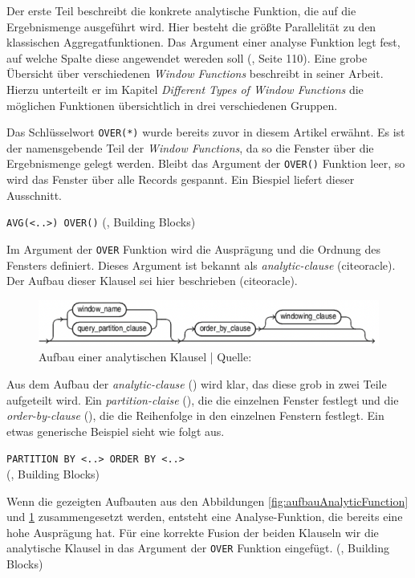 Der erste Teil beschreibt die konkrete analytische Funktion, die auf die
Ergebnismenge ausgeführt wird. Hier besteht die größte Parallelität zu den klassischen
Aggregatfunktionen. Das Argument einer analyse Funktion legt fest, auf welche Spalte
diese angewendet wereden soll (\cite{schicker2017datenbanken}, Seite 110). Eine grobe
Übersicht über verschiedenen \textit{Window Functions} beschreibt
\cite{ibrahaim23} in seiner Arbeit. Hierzu unterteilt er im Kapitel \textit{Different
Types of Window Functions} die möglichen Funktionen übersichtlich in drei
verschiedenen Gruppen.

Das Schlüsselwort \texttt{OVER(*)} wurde bereits zuvor in diesem Artikel erwähnt.
Es ist der namensgebende Teil der \textit{Window Functions}, da so die Fenster
über die Ergebnismenge gelegt werden. Bleibt das Argument der \texttt{OVER()}
Funktion leer, so wird das Fenster über alle Records gespannt. Ein Biespiel
liefert dieser Ausschnitt.

\texttt{AVG(<..>) OVER()} (\cite{Nuijten2023}, Building Blocks)

Im Argument der \texttt{OVER} Funktion wird die Ausprägung und die Ordnung des
Fensters definiert. Dieses Argument ist bekannt als \textit{analytic-clause} (cite{oracle}).
Der Aufbau dieser Klausel sei hier beschrieben (cite{oracle}).

\begin{figure}[h]
	\centering
	\includegraphics[scale=0.5]{img/aufbauAnalyticClausel.jpg}
	\caption{ Aufbau einer analytischen Klausel | Quelle: \cite{oracle}}
	\label{fig:aufbauAnalytischeKlausel}
\end{figure}

Aus dem Aufbau der \textit{analytic-clause} (\cite{oracle}) wird klar, das diese
grob in zwei Teile aufgeteilt wird. Ein \textit{partition-claise} (\cite{oracle}),
die die einzelnen Fenster festlegt und die \textit{order-by-clause} (\cite{oracle}),
die die Reihenfolge in den einzelnen Fenstern festlegt. Ein etwas generische
Beispiel sieht wie folgt aus.

\texttt{PARTITION BY <..> ORDER BY <..>} \\ (\cite{Nuijten2023}, Building Blocks)

Wenn die gezeigten Aufbauten aus den Abbildungen \ref{fig:aufbauAnalyticFunction}
und \ref{fig:aufbauAnalytischeKlausel} zusammengesetzt werden, entsteht eine
Analyse-Funktion, die bereits eine hohe Ausprägung hat. Für eine korrekte Fusion
der beiden Klauseln wir die analytische Klausel in das Argument der \texttt{OVER}
Funktion eingefügt. (\cite{Nuijten2023}, Building Blocks)

